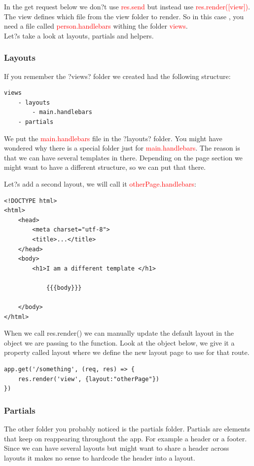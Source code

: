 \documentclass[a4paper]{article}
\begin{document}
In the get request below we don?t use \textcolor{red}{res.send} but instead use \textcolor{red}{res.render([view])}. The view defines which file from the view folder to render. So in this case , you need a file called \textcolor{red}{person.handlebars} withing the folder \textcolor{red}{views}.\\

Let?s take a look at layouts, partials and helpers.
\subsubsection{Layouts}
If you remember the ?views? folder we created had the following structure:
\begin{lstlisting}
views
    - layouts
        - main.handlebars
    - partials
\end{lstlisting}
We put the \textcolor{red}{main.handlebars} file in the ?layouts? folder. You might have wondered why there is a special folder just for \textcolor{red}{main.handlebars}. The reason is that we can have several templates in there. Depending on the page section we might want to have a different structure, so we can put that there.

Let?s add a second layout, we will call it \textcolor{red}{otherPage.handlebars}:
\begin{lstlisting}
<!DOCTYPE html>
<html>
    <head>
        <meta charset="utf-8">
        <title>...</title>
    </head>
    <body>
        <h1>I am a different template </h1>
        
            {{{body}}}
        
    </body>
</html>
\end{lstlisting}
When we call res.render() we can manually update the default layout in the object we are passing to the function. Look at the object below, we give it a property called layout where we define the new layout page to use for that route.
\begin{lstlisting}
app.get('/something', (req, res) => {
    res.render('view', {layout:"otherPage"})
})
\end{lstlisting}
\subsubsection{Partials}
The other folder you probably noticed is the partials folder. Partials are elements that keep on reappearing throughout the app. For example a header or a footer. Since we can have several layouts but might want to share a header across layouts it makes no sense to hardcode the header into a layout.
\end{document}
